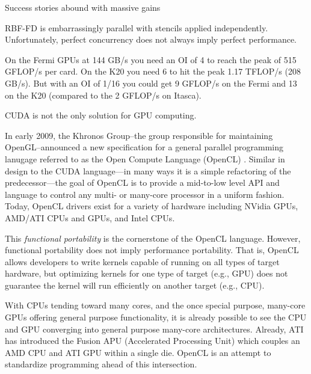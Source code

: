 \documentclass{report}
\begin{document}
Success stories abound with massive gains

RBF-FD is embarrassingly parallel with stencils applied independently. Unfortunately, perfect concurrency does not always imply perfect performance. %

On the Fermi GPUs at 144 GB/s you need an OI of 4 to reach the peak of 515 GFLOP/s per card. On the K20 you need 6 to hit the peak 1.17 TFLOP/s (208 GB/s). But with an OI of 1/16 you could get 9 GFLOP/s on the Fermi and 13 on the K20 (compared to the 2 GFLOP/s on Itasca). 




CUDA is not the only solution for GPU computing. 


In early 2009, the Khronos Group--the group responsible for maintaining OpenGL--announced a new specification for a general 
parallel programming lanugage referred to as the Open Compute Language (OpenCL) \cite{OpenCL2009}. Similar in design to the CUDA language---in many ways it is a simple refactoring of the predecessor---the goal of OpenCL is to provide a mid-to-low level API and language to control any multi- or many-core processor in a uniform fashion. Today, OpenCL drivers exist for a variety of hardware including NVidia GPUs, AMD/ATI CPUs and GPUs, and Intel CPUs. 

This \textit{functional portability} is the cornerstone of the OpenCL language. However, functional portability does not imply performance portability. That is, OpenCL allows developers to write kernels capable of running on all types of target hardware, but optimizing kernels for one type of target (e.g., GPU) does not guarantee the kernel will run efficiently on another target (e.g., CPU).

With CPUs tending toward many cores, and the once special purpose, many-core GPUs offering general purpose functionality, it is already possible to see the CPU and GPU converging into general purpose many-core architectures. Already, ATI has introduced the Fusion APU (Accelerated Processing Unit) which couples an AMD CPU and ATI GPU within a single die. OpenCL is an attempt to standardize programming ahead of this intersection. 
\end{document}
